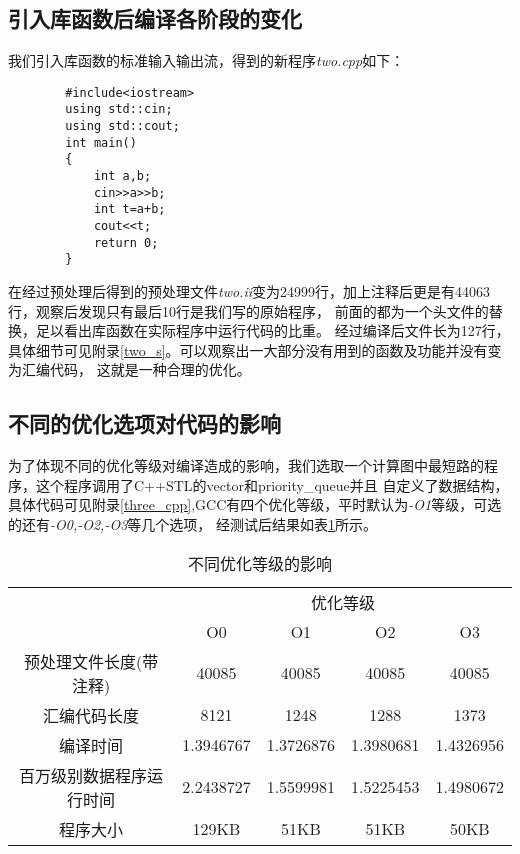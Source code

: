 \documentclass[UTF8]{ctexart}
\begin{document}
    \subsection{引入库函数后编译各阶段的变化}
    我们引入库函数的标准输入输出流，得到的新程序\emph{two.cpp}如下：
    \begin{verbatim}
        #include<iostream>
        using std::cin;
        using std::cout;
        int main()
        {
            int a,b;
            cin>>a>>b;
            int t=a+b;
            cout<<t;
            return 0;
        }
    \end{verbatim}
    在经过预处理后得到的预处理文件\emph{two.ii}变为24999行，加上注释后更是有44063行，观察后发现只有最后10行是我们写的原始程序，
    前面的都为一个头文件的替换，足以看出库函数在实际程序中运行代码的比重。
    经过编译后文件长为127行，具体细节可见附录\ref{two_s}。可以观察出一大部分没有用到的函数及功能并没有变为汇编代码，
    这就是一种合理的优化。
    \subsection{不同的优化选项对代码的影响}
    为了体现不同的优化等级对编译造成的影响，我们选取一个计算图中最短路的程序，这个程序调用了C++STL的vector和priority\_queue并且
    自定义了数据结构，具体代码可见附录\ref{three_cpp},GCC有四个优化等级，平时默认为\emph{-O1}等级，可选的还有\emph{-O0,-O2,-O3}等几个选项，
    经测试后结果如表\ref{optimize_list}所示。
    \begin{table}[h]
        \centering
        \begin{tabular}{ccccc}
            \toprule
            & \multicolumn{4}{c}{优化等级} \\
            \cmidrule{2-5}
            & O0 & O1 & O2 & O3 \\
            \midrule
            预处理文件长度(带注释) & 40085 & 40085 & 40085 & 40085 \\
            汇编代码长度 & 8121 & 1248 & 1288 & 1373 \\
            编译时间 & 1.3946767 & 1.3726876 & 1.3980681 & 1.4326956\\
            百万级别数据程序运行时间 & 2.2438727 & 1.5599981 & 1.5225453 & 1.4980672 \\
            程序大小 & 129KB & 51KB & 51KB & 50KB \\
            \bottomrule
        \end{tabular} 
        \caption{不同优化等级的影响}\label{optimize_list}
    \end{table}
\end{document}
